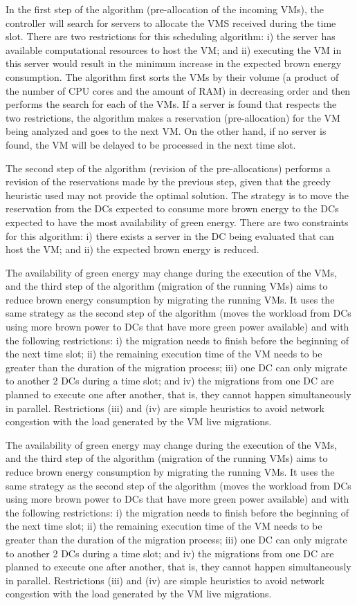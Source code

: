 In the first step of the algorithm (pre-allocation of the incoming VMs), the controller will search for servers to allocate the VMS received during the time slot. There are two restrictions for this scheduling algorithm: i) the server has available computational resources to host the VM;  and ii) executing the VM in this server would result in the minimum increase in the expected brown energy consumption. The algorithm first sorts the VMs by their volume (a product of the number of CPU cores and the amount of RAM) in decreasing order and then performs the search for each of the VMs. If a server is found that respects the two restrictions, the algorithm makes a reservation (pre-allocation) for the VM being analyzed and goes to the next VM. On the other hand, if no server is found, the VM will be delayed to be processed in the next time slot.

The second step of the algorithm (revision of the pre-allocations) performs a revision of the reservations made by the previous step, given that the greedy heuristic used may not provide the optimal solution.  The strategy is to move the reservation from the DCs expected to consume more brown energy to the DCs expected to have the most availability of green energy.  There are two constraints for this algorithm: i) there exists a server in the DC being evaluated that can host the VM; and ii) the expected brown energy is reduced.

The availability of green energy may change during the execution of the VMs, and the third step of the algorithm (migration of the running VMs) aims to reduce brown energy consumption by migrating the running VMs. It uses the same strategy as the second step of the algorithm (moves the workload from DCs using more brown power to DCs that have more green power available) and with the following restrictions: i) the migration needs to finish before the beginning of the next time slot; ii) the remaining execution time of the VM needs to be greater than the duration of the migration process; iii) one DC can only migrate to another 2 DCs during a time slot; and iv) the migrations from one DC are planned to execute one after another, that is, they cannot happen simultaneously in parallel. Restrictions (iii) and (iv) are simple heuristics to avoid network congestion with the load generated by the VM live migrations.

The availability of green energy may change during the execution of the VMs, and the third step of the algorithm (migration of the running VMs) aims to reduce brown energy consumption by migrating the running VMs. It uses the same strategy as the second step of the algorithm (moves the workload from DCs using more brown power to DCs that have more green power available) and with the following restrictions: i) the migration needs to finish before the beginning of the next time slot; ii) the remaining execution time of the VM needs to be greater than the duration of the migration process; iii) one DC can only migrate to another 2 DCs during a time slot; and iv) the migrations from one DC are planned to execute one after another, that is, they cannot happen simultaneously in parallel. Restrictions (iii) and (iv) are simple heuristics to avoid network congestion with the load generated by the VM live migrations.



